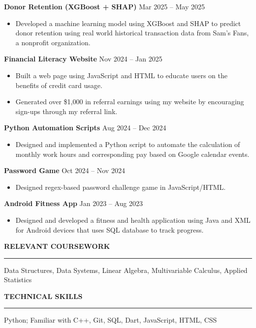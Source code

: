 \documentclass[12pt]{article}
\newcommand{\resumeSection}[1]{\vspace{6pt}\noindent\textbf{\large #1}\vspace{3pt}\hrule\vspace{5pt}}
\newcommand{\resumeProject}[2]{
  \noindent\textbf{#1} \hfill #2
  \vspace{-1pt} %
}
\newenvironment{resumeItemize}{
  \begin{itemize}[leftmargin=0.15in, label={--}, itemsep=1pt, topsep=0pt]
}{\end{itemize}}
\begin{document}
\resumeProject{Donor Retention (XGBoost + SHAP)}{Mar 2025 -- May 2025}
\begin{resumeItemize}
  \item Developed a machine learning model using XGBoost and SHAP to predict donor retention using real world historical transaction data from Sam’s Fans, a nonprofit organization.
\end{resumeItemize}

\resumeProject{Financial Literacy Website}{Nov 2024 -- Jan 2025}
\begin{resumeItemize}
  \item Built a web page using JavaScript and HTML to educate users on the benefits of credit card usage.
  \item Generated over \$1,000 in referral earnings using my website by encouraging sign-ups through my referral link.
\end{resumeItemize}

\resumeProject{Python Automation Scripts}{Aug 2024 -- Dec 2024}
\begin{resumeItemize}
  \item Designed and implemented a Python script to automate the calculation of monthly work hours and corresponding pay based on Google calendar events.
\end{resumeItemize}

\resumeProject{Password Game}{Oct 2024 -- Nov 2024}
\begin{resumeItemize}
  \item Designed regex-based password challenge game in JavaScript/HTML.
\end{resumeItemize}

\resumeProject{Android Fitness App}{Jan 2023 -- Aug 2023}
\begin{resumeItemize}
  \item Designed and developed a fitness and health application using Java and XML for Android devices that uses SQL database to track progress.
\end{resumeItemize}

\resumeSection{RELEVANT COURSEWORK}
Data Structures, Data Systems, Linear Algebra, Multivariable Calculus, Applied Statistics

\resumeSection{TECHNICAL SKILLS}
Python; Familiar with C++, Git, SQL, Dart, JavaScript, HTML, CSS
\end{document}
